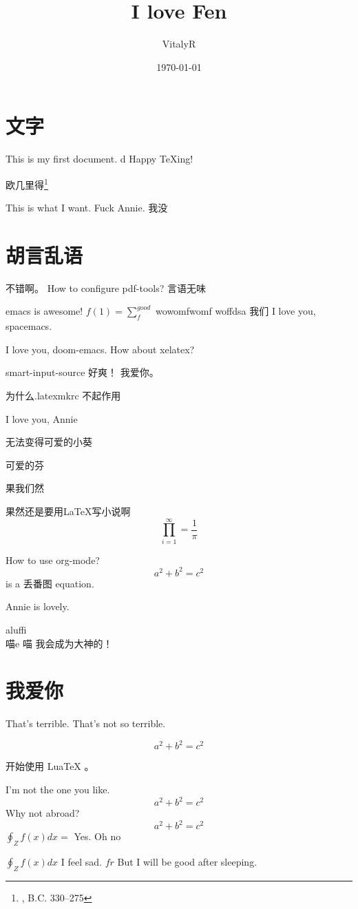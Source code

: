 \documentclass[UTF8]{ctexart}
\title{I love Fen}
\author{VitalyR}
\date{\today}
\begin{document}
\maketitle
\tableofcontents

\section{文字}
This is my first document.
d
Happy \TeX ing!

欧几里得\footnote{, B.C. 330--275}

This is what I want.
Fuck Annie.
我没

\section{胡言乱语}

不错啊。
How to configure pdf-tools?
言语无味

emacs is awesome!
\(f(1)=\sum_{f}^{good}\)
wowomfwomf woffdsa
我们
I love you, spacemacs.

I love you, doom-emacs.
How about xelatex?


smart-input-source 好爽！
我爱你。

为什么.latexmkrc 不起作用

I love you, Annie

无法变得可爱的小葵

可爱的芬

果我们然

果然还是要用\LaTeX 写小说啊
\begin{equation}
	\prod_{i=1}^{\infty}=\frac{1}{\pi}
\end{equation}

How to use org-mode?
\[a^{2}+b^{2}=c^{2}\] is a 丢番图 equation.

Annie is lovely.

aluffi \\
喵e
喵
我会成为大神的！

\section{我爱你}

That's terrible.
That's not so terrible.

\begin{equation}
	\label{eq:2}
	a^{2}+b^{2}=c^{2}
\end{equation}

开始使用 LuaTeX 。

I'm not the one you like.
\[a^{2}+b^{2}=c^{2}\]
Why not abroad?
\[a^{2}+b^{2}=c^{2}\] \(\oint_{Z}f(x)dx = \) Yes.
Oh
no

\(\oint_{Z}f(x)dx\)
I feel sad.
\(fr\)
But I will be good after sleeping.
\end{document}
